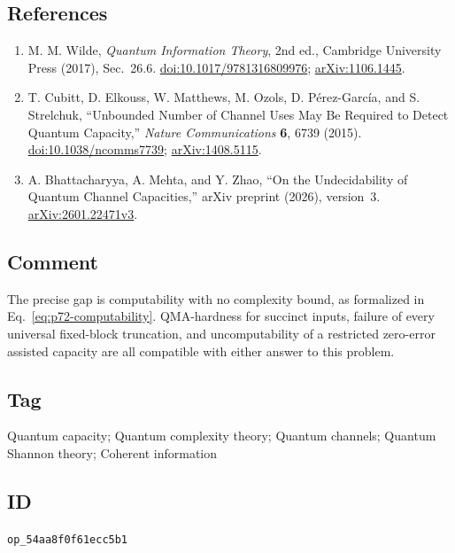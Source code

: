 \subsection*{References}

\begin{enumerate}[label={},leftmargin=4.8em,labelsep=0.5em]
  \footnotesize
  \item[\textup{[Wil17]}]\label{ref:p72-wilde}
  M. M. Wilde, \emph{Quantum Information Theory}, 2nd ed., Cambridge
  University Press (2017), Sec.~26.6.
  \href{https://doi.org/10.1017/9781316809976}%
       {doi:10.1017/9781316809976};
  \href{https://arxiv.org/abs/1106.1445}{arXiv:1106.1445}.

  \item[\textup{[CEM+15]}]\label{ref:p72-cubitt-et-al}
  T. Cubitt, D. Elkouss, W. Matthews, M. Ozols, D. P\'erez-Garc\'ia, and
  S. Strelchuk, ``Unbounded Number of Channel Uses May Be Required to Detect
  Quantum Capacity,'' \emph{Nature Communications} \textbf{6}, 6739 (2015).
  \href{https://doi.org/10.1038/ncomms7739}{doi:10.1038/ncomms7739};
  \href{https://arxiv.org/abs/1408.5115}{arXiv:1408.5115}.

  \item[\textup{[BMZ26]}]\label{ref:p72-bhattacharyya-mehta-zhao}
  A. Bhattacharyya, A. Mehta, and Y. Zhao,
  ``On the Undecidability of Quantum Channel Capacities,'' arXiv preprint
  (2026), version~3.
  \href{https://arxiv.org/abs/2601.22471v3}{arXiv:2601.22471v3}.
\end{enumerate}

\subsection*{Comment}

The precise gap is computability with no complexity bound, as formalized in
Eq.~\eqref{eq:p72-computability}.  QMA-hardness for succinct inputs, failure
of every universal fixed-block truncation, and uncomputability of a restricted
zero-error assisted capacity are all compatible with either answer to this
problem.

\subsection*{Tag}

Quantum capacity; Quantum complexity theory; Quantum channels; Quantum
Shannon theory; Coherent information

\subsection*{ID}

\texttt{op\_54aa8f0f61ecc5b1}
